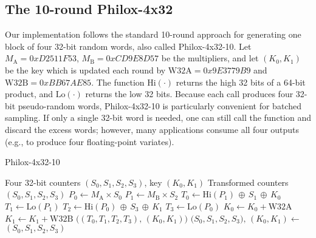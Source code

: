 \subsection{The 10-round Philox-4x32}
Our implementation follows the standard 10-round approach for generating one block of four 32-bit random words, also called Philox-4x32-10. Let \(M_{\mathrm{A}}=0xD2511F53\), \(M_{\mathrm{B}}=0xCD9E8D57\) be the multipliers, and let \((K_0, K_1)\) be the key which is updated each round by \(\mathrm{W32A}=0x9E3779B9\) and \(\mathrm{W32B}=0xBB67AE85\). The function \(\text{Hi}(\cdot)\) returns the high 32 bits of a 64-bit product, and \(\text{Lo}(\cdot)\) returns the low 32 bits. Because each call produces four 32-bit pseudo-random words, Philox-4x32-10 is particularly convenient for batched sampling. If only a single 32-bit word is needed, one can still call the function and discard the excess words; however, many applications consume all four outputs (e.g., to produce four floating-point variates).

\begin{algorithm}[ht]
  \caption{Philox-4x32-10}\label{alg:philox}
  \begin{algorithmic}[1]
    \Require Four 32-bit counters $(S_0,S_1,S_2,S_3)$,
            key $(K_0,K_1)$
    \Ensure  Transformed counters $(S_0,S_1,S_2,S_3)$
    \Statex
      \State $P_0 \gets M_{\text{A}}\times S_0$ 
      \State $P_1 \gets M_{\text{B}}\times S_2$ 
      \State $T_0 \gets \mathrm{Hi}(P_1)\,\oplus\,S_1\,\oplus\,K_0$
      \State $T_1 \gets \mathrm{Lo}(P_1)$
      \State $T_2 \gets \mathrm{Hi}(P_0)\,\oplus\,S_3\,\oplus\,K_1$
      \State $T_3 \gets \mathrm{Lo}(P_0)$
      \State $K_0 \gets K_0 + \mathrm{W32A}$
      \State $K_1 \gets K_1 + \mathrm{W32B}$
      \State \Return $\bigl((T_0,T_1,T_2,T_3),\,(K_0,K_1)\bigr)$
    \EndProcedure
    \Statex
        \State $\bigl(S_0,S_1,S_2,S_3),\,(K_0,K_1) \gets$
      \EndFor
      \State \Return $(S_0,S_1,S_2,S_3)$
    \EndProcedure
  \end{algorithmic}
\end{algorithm}

